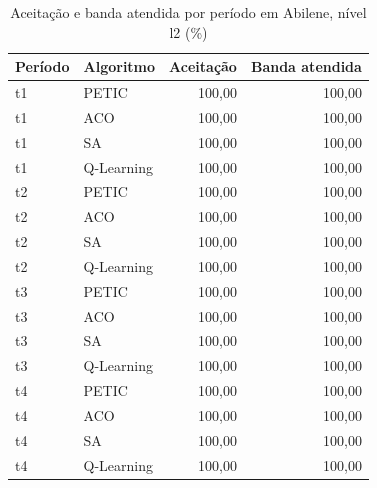 \begin{table}[htb]
    \centering
    \scriptsize
    \caption{Aceitação e banda atendida por período em Abilene, nível l2 (\%)}
    \label{tab:periodos-abilene-l2}
    \begin{tabular}{llrr}
        \hline
        Período & Algoritmo & Aceitação & Banda atendida \\
        \hline
        t1 & PETIC & 100,00 & 100,00 \\
        t1 & ACO & 100,00 & 100,00 \\
        t1 & SA & 100,00 & 100,00 \\
        t1 & Q-Learning & 100,00 & 100,00 \\
        t2 & PETIC & 100,00 & 100,00 \\
        t2 & ACO & 100,00 & 100,00 \\
        t2 & SA & 100,00 & 100,00 \\
        t2 & Q-Learning & 100,00 & 100,00 \\
        t3 & PETIC & 100,00 & 100,00 \\
        t3 & ACO & 100,00 & 100,00 \\
        t3 & SA & 100,00 & 100,00 \\
        t3 & Q-Learning & 100,00 & 100,00 \\
        t4 & PETIC & 100,00 & 100,00 \\
        t4 & ACO & 100,00 & 100,00 \\
        t4 & SA & 100,00 & 100,00 \\
        t4 & Q-Learning & 100,00 & 100,00 \\
        \hline
    \end{tabular}
\end{table}

